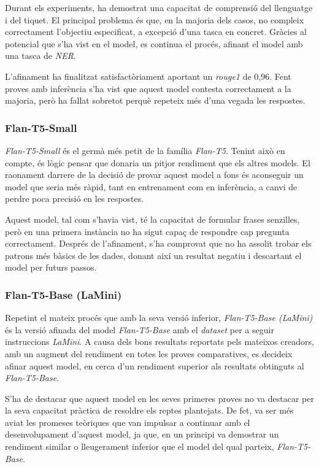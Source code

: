 Durant els experiments, ha demostrat una capacitat de comprensió del llenguatge i del tiquet. El principal problema és que, en la majoria dels casos, no compleix correctament l'objectiu especificat, a excepció d'una tasca en concret. Gràcies al potencial que s'ha vist en el model, es continua el procés, afinant el model amb una tasca de \textit{NER}.

L'afinament ha finalitzat satisfactòriament aportant un \textit{rouge1} de 0,96. Fent proves amb inferència s'ha vist que aquest model contesta correctament a la majoria, però ha fallat sobretot perquè repeteix més d'una vegada les respostes.

\subsubsection{Flan-T5-Small}
\textit{Flan-T5-Small} \cite{flan-t5} és el germà més petit de la família \textit{Flan-T5}. Tenint això en compte, és lògic pensar que donaria un pitjor rendiment que els altres models. El raonament darrere de la decisió de provar aquest model a fons és aconseguir un model que seria més ràpid, tant en entrenament com en inferència, a canvi de perdre poca precisió en les respostes.

Aquest model, tal com s'havia vist, té la capacitat de formular frases senzilles, però en una primera instància no ha sigut capaç de respondre cap pregunta correctament. Després de l'afinament, s'ha comprovat que no ha assolit trobar els patrons més bàsics de les dades, donant així un resultat negatiu i descartant el model per futurs passos.

\subsubsection{Flan-T5-Base (LaMini)}
Repetint el mateix procés que amb la seva versió inferior, \textit{Flan-T5-Base (LaMini)} \cite{flan-t5} \cite{lamini} és la versió afinada del model \textit{Flan-T5-Base} amb el \textit{dataset} per a seguir instruccions \textit{LaMini}. A causa dels bons resultats reportats pels mateixos creadors, amb un augment del rendiment en totes les proves comparatives, es decideix afinar aquest model, en cerca d'un rendiment superior als resultats obtinguts al \textit{Flan-T5-Base}. 

S'ha de destacar que aquest model en les seves primeres proves no va destacar per la seva capacitat pràctica de resoldre els reptes plantejats. De fet, va ser més aviat les promeses teòriques que van impulsar a continuar amb el desenvolupament d'aquest model, ja que, en un principi va demostrar un rendiment similar o lleugerament inferior que el model del qual parteix, \textit{Flan-T5-Base}.

